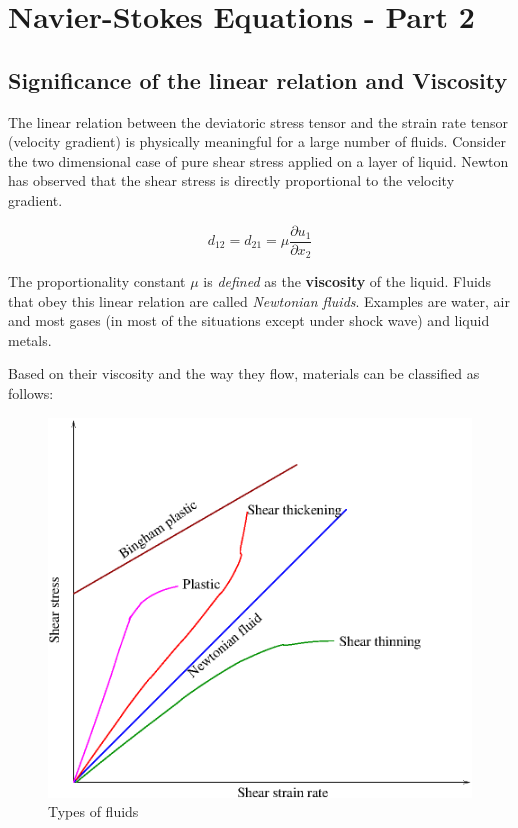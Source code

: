 \chapter{Navier-Stokes Equations - Part 2}
\label{ch:nsderive2}

\section{Significance of the linear relation and Viscosity}

The linear relation between the deviatoric stress tensor and the strain rate tensor (velocity gradient) is physically meaningful for a large number of fluids. Consider the two dimensional case of pure shear stress applied on a layer of liquid. Newton has observed that the shear stress is directly proportional to the velocity gradient.

\begin{equation}
d_{12} = d_{21} = \mu \frac{\partial u_1}{\partial x_2} 
\end{equation} 

The proportionality constant $\mu$ is {\em defined} as the {\bf viscosity} of the liquid. Fluids that obey this linear relation are called {\em Newtonian fluids}. Examples are water, air and most gases (in most of the situations except under shock wave) and liquid metals. 


Based on their viscosity and the way they flow, materials can be classified as follows:

\begin{figure}[h]
 \centering
 \includegraphics[width=5 in]{images/c10-fluidtypes.eps}
 \caption{Types of fluids}
 \label{fluidtypes}
\end{figure}

